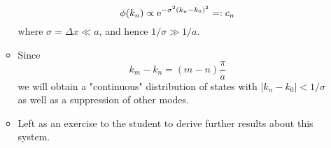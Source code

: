 \documentclass[../notes.tex]{subfiles}
\begin{document}
\begin{itemize}
\begin{itemize}
\begin{equation*}
            \phi(k_n) \propto \e[-\sigma^2(k_n-k_0)^2] =: c_n
        \end{equation*}
        where $\sigma=\Delta x\ll a$, and hence $1/\sigma\gg 1/a$.
        \item Since
        \begin{equation*}
            k_m-k_n = (m-n)\frac{\pi}{a}
        \end{equation*}
        we will obtain a "continuous" distribution of states with $|k_n-k_0|<1/\sigma$ as well as a suppression of other modes.
        \item Left as an exercise to the student to derive further results about this system.
    \end{itemize}
\end{itemize}
\end{document}
